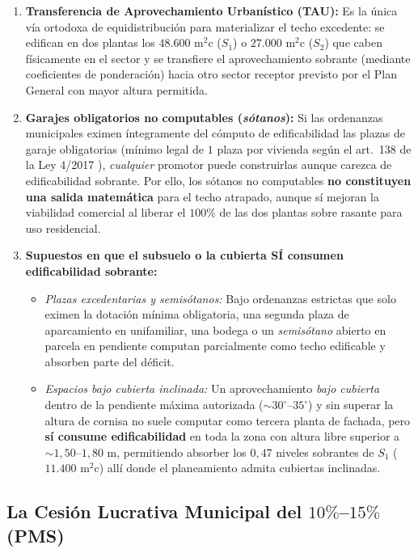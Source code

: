 \begin{enumerate}
  \item \textbf{Transferencia de Aprovechamiento Urbanístico (TAU):} Es la única vía ortodoxa de equidistribución para materializar el techo excedente: se edifican en dos plantas los $48.600\text{ m}^2\text{c}$ ($S_1$) o $27.000\text{ m}^2\text{c}$ ($S_2$) que caben físicamente en el sector y se transfiere el aprovechamiento sobrante (mediante coeficientes de ponderación) hacia otro sector receptor previsto por el Plan General con mayor altura permitida.
  \item \textbf{Garajes obligatorios no computables (\emph{sótanos}):} Si las ordenanzas municipales eximen íntegramente del cómputo de edificabilidad las plazas de garaje obligatorias (mínimo legal de $1$ plaza por vivienda según el art.~138 de la Ley 4/2017 \cite{ley4_2017_canarias}), \emph{cualquier} promotor puede construirlas aunque carezca de edificabilidad sobrante. Por ello, los sótanos no computables \textbf{no constituyen una salida matemática} para el techo atrapado, aunque sí mejoran la viabilidad comercial al liberar el $100\%$ de las dos plantas sobre rasante para uso residencial.
  \item \textbf{Supuestos en que el subsuelo o la cubierta SÍ consumen edificabilidad sobrante:}
  \begin{itemize}
    \item \emph{Plazas excedentarias y semisótanos:} Bajo ordenanzas estrictas que solo eximen la dotación mínima obligatoria, una segunda plaza de aparcamiento en unifamiliar, una bodega o un \emph{semisótano} abierto en parcela en pendiente computan parcialmente como techo edificable y absorben parte del déficit.
    \item \emph{Espacios bajo cubierta inclinada:} Un aprovechamiento \emph{bajo cubierta} dentro de la pendiente máxima autorizada ($\sim 30^\circ$--$35^\circ$) y sin superar la altura de cornisa no suele computar como tercera planta de fachada, pero \textbf{sí consume edificabilidad} en toda la zona con altura libre superior a $\sim 1,50$--$1,80\text{ m}$, permitiendo absorber los $0,47$ niveles sobrantes de $S_1$ ($11.400\text{ m}^2\text{c}$) allí donde el planeamiento admita cubiertas inclinadas.
  \end{itemize}
\end{enumerate}

\subsection{La Cesión Lucrativa Municipal del $10\%$--$15\%$ (PMS)}
\label{sub:cesion_municipal}

